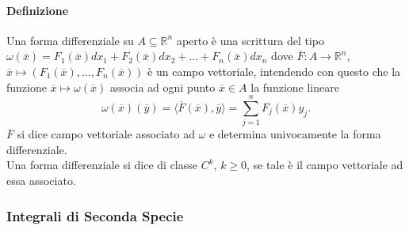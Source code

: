 \documentclass{article}
\newcommand{\R}{\mathbb{R}}
\begin{document}
\paragraph{{Definizione}}
Una forma differenziale su $A \subseteq \R^n$ aperto è una scrittura del tipo 
$\omega (\overline{x})=F_1(\overline{x})dx_1 +F_2(\overline{x})dx_2 +...+ F_n(\overline{x})dx_n$ dove $\overline{F}: A \rightarrow \R^n$, $\overline{x} \mapsto (F_1(\overline{x}),...,F_n(\overline{x}))$ è un campo vettoriale, intendendo con questo che la funzione $\overline{x}\mapsto \omega (\overline{x})$ associa ad ogni punto $\overline{x} \in A$ la funzione lineare
\begin{equation*}
    \omega(\overline{x})(\overline{y}) =\langle \overline{F}(\overline{x}),\overline{y}\rangle =\sum_{j=1}^n F_j (\overline{x}) y_j.
\end{equation*}
$\overline{F}$ si dice campo vettoriale associato ad $\omega$ e determina univocamente la forma differenziale.\\
Una forma differenziale si dice di classe $C^k$, $k \geq 0$, se tale è il campo vettoriale ad essa associato.

\subsubsection{Integrali di Seconda Specie}
\end{document}
